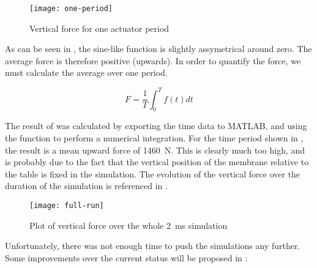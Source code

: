 \begin{figure}[h]
  \begin{center}
    \texttt{[image: one-period]}
  \end{center}
  \caption{Vertical force for one actuator period}
  \label{fig:one-period}
\end{figure}

As can be seen in , the sine-like function is slightly
assymetrical around zero. The average force is therefore positive (upwards).
In order to quantify the force, we must calculate the average over one period. 

\begin{equation}
  F = \frac{1}{T} \int_{0}^{T} f(t) dt
  \label{eq:force}
\end{equation}

The result of  was calculated by exporting the time data to MATLAB,
and using the  function to perform a numerical integration. For the
time period shown in , the result is a mean upward force of
\SI{1460}{\newton}.  
This is clearly much too high, and is probably due to the fact that the vertical
position of the membrane relative to the table is fixed in the simulation. The
evolution of the vertical force over the duration of the simulation is
referenced in .

\begin{figure}[h]
  \begin{center}
    \texttt{[image: full-run]}
  \end{center}
  \caption{Plot of vertical force over the whole \SI{2}{\milli\second}
  simulation}
  \label{fig:full-run}
\end{figure}

Unfortunately, there was not enough time to push the simulations any further.
Some improvements over the current status will be proposed in
 : 
